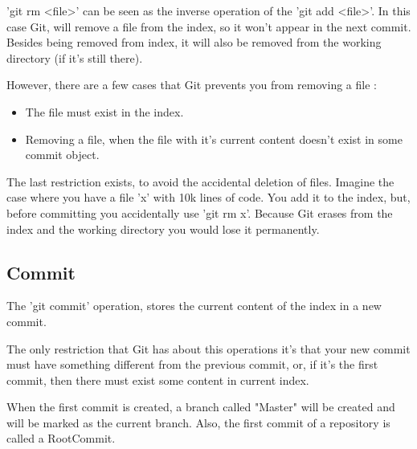 \pagebreak

'git rm <file>' can be seen as the inverse operation of the 'git add <file>'.
In this case Git, will remove a file from the index, so it won't appear in the
next commit. Besides being removed from index, it will also be removed from the 
working directory (if it's still there). \par
However, there are a few cases that Git prevents you from removing a file : 
\begin{itemize}
\item The file must exist in the index.
\item Removing a file, when the file with it's current content 
doesn't exist in some commit object.
\end{itemize}
The last restriction exists, to avoid the accidental deletion of files. Imagine the
case where you have a file 'x' with 10k lines of code. You add it to the index,
but, before committing you accidentally use 'git rm x'. Because Git erases from
the index and the working directory you would lose it permanently.

%

\subsection{Commit}

The 'git commit' operation, stores the current content of the index in a new
commit. \par
The only restriction that Git has about this operations 
it's that your new commit must have something different from the previous
commit, or, if it's the first commit, then there must exist some content in
current index. \par
When the first commit is created, a branch called "Master" will be created
and will be marked as the current branch. Also, the first commit of a repository
is called a RootCommit. \par

